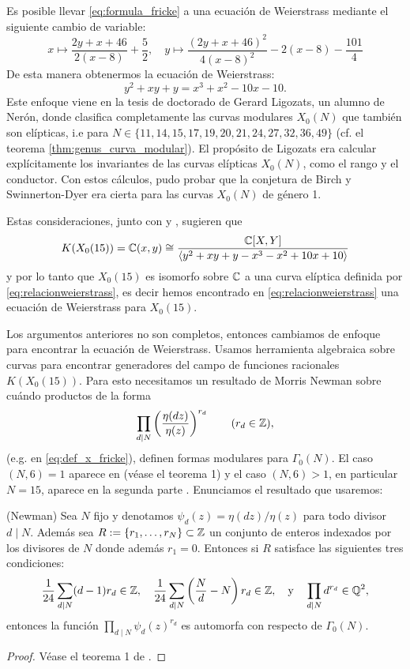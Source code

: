 \documentclass[../../tesis_maestria]{subfiles}
\begin{document}
Es posible llevar \eqref{eq:formula_fricke} a una ecuación de Weierstrass mediante el siguiente cambio de variable:
	\[
		x\mapsto \frac{2y+x+46}{2(x-8)}+\frac{5}{2},\quad
		y\mapsto \frac{(2y+x+46)^2}{4(x-8)^2}-2(x-8)-\frac{101}{4}
	\]
De esta manera obtenermos la ecuación de Weierstrass:
	\begin{equation}\label{eq:relacionweierstrass}
		y^2+xy+y=x^3+x^2-10x-10.
	\end{equation}
Este enfoque viene en la tesis de doctorado de Gerard Ligozats, un alumno de Nerón, donde clasifica completamente las curvas modulares $X_0(N)$ que también son elípticas, i.e para $N\in\{11,14,15,17,19,20,21,24,27,32,36,49\}$ \cite{LigozatCMDG1} (cf. el teorema \ref{thm:genus_curva_modular}). El propósito de Ligozats era calcular explícitamente los invariantes de las curvas elípticas $X_0(N)$, como el rango y el conductor. Con estos cálculos, pudo probar que la conjetura de Birch y Swinnerton-Dyer era cierta para las curvas $X_0(N)$ de género 1.

Estas consideraciones, junto con \cite{Fricke} y \cite{LigozatCMDG1}, sugieren que
\[
	K(X_0(15))=\mathbb{C}(x,y)\cong\frac{\mathbb{C}[X,Y]}{\langle y^2+xy+y-x^3-x^2+10x+10 \rangle}
\]
y por lo tanto que $X_0(15)$ es isomorfo sobre $\mathbb{C}$ a una curva elíptica definida por \eqref{eq:relacionweierstrass}, es decir hemos encontrado en \eqref{eq:relacionweierstrass} una ecuación de Weierstrass para $X_0(15)$.

Los argumentos anteriores no son completos, entonces cambiamos de enfoque para encontrar la ecuación de Weierstrass. Usamos herramienta algebraica sobre curvas para encontrar generadores del campo de funciones racionales $K(X_0(15))$. Para esto necesitamos un resultado de Morris Newman sobre cuándo productos de la forma
\[
	\prod_{d\mid N}\left(\frac{\eta(dz)}{\eta(z)}\right)^{r_d}\qquad(r_d\in\mathbb{Z}),
\]
(e.g. en \eqref{eq:def_x_fricke}), definen formas modulares para $\Gamma_0(N)$. El caso $(N,6)=1$ aparece en \cite{NewmanCAAOACOMFI} (véase el teorema 1) y el caso $(N,6)>1$, en particular $N=15$, aparece en la segunda parte \cite{NewmanCAAOACOMFII}. Enunciamos el resultado que usaremos:

\begin{thm}\label{thm:newman}
	(Newman) Sea $N$ fijo y denotamos $\psi_d(z)=\eta(dz)/\eta(z)$ para todo divisor $d\mid N$. Además sea $R:=\{r_1,\ldots,r_N\}\subset\mathbb{Z}$ un conjunto de enteros indexados por los divisores de $N$ donde además $r_1=0$. Entonces si $R$ satisface las siguientes tres condiciones:
	\[
		\frac{1}{24}\sum_{d\mid N}(d-1)r_d\in\mathbb{Z},\quad
		\frac{1}{24}\sum_{d\mid N}\left(\frac{N}{d}-N\right)r_d\in\mathbb{Z},\quad\mathrm{y}\quad
		\prod_{d\mid N}d^{r_d}\in\mathbb{Q}^2,
	\]
	entonces la función $\prod_{d\mid N}\psi_d(z)^{r_d}$ es automorfa con respecto de $\Gamma_0(N)$.
\end{thm}
\begin{proof}
	Véase el teorema 1 de \cite{NewmanCAAOACOMFII}.
\end{proof}
\end{document}
